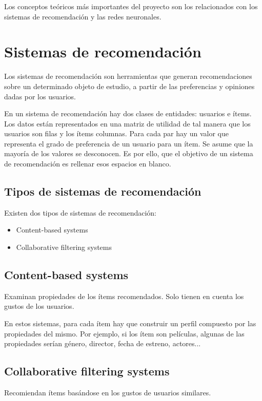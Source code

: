 
Los conceptos teóricos más importantes del proyecto son los relacionados con los sistemas de recomendación y las redes neuronales.

\section{Sistemas de recomendación}\label{sistemas-de-recomendacion}
Los sistemas de recomendación son herramientas que generan recomendaciones sobre un determinado objeto de estudio, a partir de las preferencias y opiniones dadas por los usuarios.\cite{definicion-sistemas-recomendacion}

En un sistema de recomendación hay dos clases de entidades: usuarios e ítems. Los datos están representados en una matriz de utilidad de tal manera que los usuarios son filas y los ítems columnas. Para cada par hay un valor que representa el grado de preferencia de un usuario para un ítem. Se asume que la mayoría de los valores se desconocen. Es por ello, que el objetivo de un sistema de recomendación es rellenar esos espacios en blanco.

\subsection{Tipos de sistemas de recomendación}\label{tipos-sistemas-recomendacion}
Existen dos tipos de sistemas de recomendación:
\begin{itemize}
\tightlist
\item Content-based systems
\item Collaborative filtering systems
\end{itemize}

\subsection{Content-based systems}\label{content-based-systems}
Examinan propiedades de los ítems recomendados. Solo tienen en cuenta los gustos de los usuarios.

En estos sistemas, para cada ítem hay que construir un perfil compuesto por las propiedades del mismo. Por ejemplo, si los ítem son películas, algunas de las propiedades serían género, director, fecha de estreno, actores...

\subsection{Collaborative filtering systems}\label{collaborative-filtering}
Recomiendan ítems basándose en los gustos de usuarios similares.

